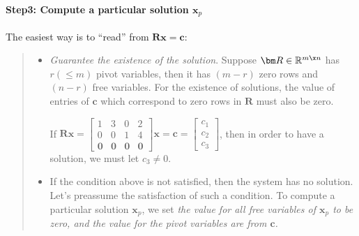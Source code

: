 \paragraph{Step3: Compute a particular solution $\bm x_p$}
The easiest way is to ``read'' from $\bm{Rx} = \bm c$:
\begin{quotation}
\begin{itemize}
\item
\emph{Guarantee the existence of the solution}. Suppose $\bm R\in\mathbb{R}^{m\x n}$ has $r (\le m)$ pivot variables, then it has $(m-r)$ zero rows and $(n-r)$ free variables. For the existence of solutions, the value of entries of $\bm c$ which correspond to zero rows in $\bm R$ must also be zero.
\begin{example}
If $\bm{Rx} = \begin{bmatrix}
1&3&0&2\\0&0&1&4\\\bm 0&\bm 0&\bm 0&\bm 0
\end{bmatrix}\bm x = \bm c = \begin{bmatrix}
c_1\\c_2\\c_3
\end{bmatrix}$, then in order to have a solution, we must let $c_3\ne 0$.
\end{example}
\item
If the condition above is not satisfied, then the system has no solution. Let's preassume the satisfaction of such a condition. To compute a particular solution $\bm x_p$, we set \textit{the value for all \emph{free variables} of $\bm x_p$ to be zero, and the value for the pivot variables are from $\bm c$.} 


\end{itemize}
\end{quotation}
